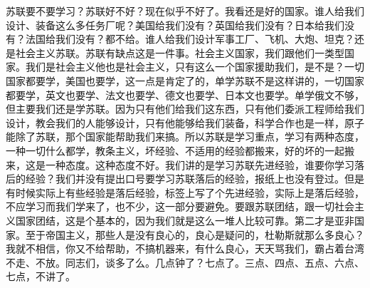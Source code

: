 苏联要不要学习？苏联好不好？现在似乎不好了。我看还是好的国家。谁人给我们设计、装备这么多任务厂呢？美国给我们没有？英国给我们没有？日本给我们没有？法国给我们没有？都不给。谁人给我们设计军事工厂、飞机、大炮、坦克？还是社会主义苏联。苏联有缺点这是一件事。社会主义国家，我们跟他们一类型国家。我们是社会主义他也是社会主义，只有这么一个国家援助我们，是不是？一切国家都要学，美国也要学，这一点是肯定了的，单学苏联不是这样讲的，一切国家都要学，英文也要学、法文也要学、德文也要学、日本文也要学。单学俄文不够，但主要我们还是学苏联。因为只有他们给我们这东西，只有他们委派工程师给我们设计，教会我们的人能够设计，只有他能够给我们装备，科学合作也是一样，原子能除了苏联，那个国家能帮助我们来搞。所以苏联是学习重点，学习有两种态度，一种一切什么都学，教条主义，坏经验、不适用的经验都搬来，好的坏的一起搬来，这是一种态度。这种态度不好。我们讲的是学习苏联先进经验，谁要你学习落后的经验？我们并没有提出口号要学习苏联落后的经验，报纸上也没有登过。但是有时候实际上有些经验是落后经验，标签上写了个先进经验，实际上是落后经验，不应学习而我们学来了，也不少，这一部分要避免。要跟苏联团结，跟一切社会主义国家团结，这是个基本的，因为我们就是这么一堆人比较可靠。第二才是亚非国家。至于帝国主义，那些人是没有良心的，良心是疑问的，杜勒斯就那么多良心？我就不相信，你又不给帮助，不搞机器来，有什么良心，天天骂我们，霸占着台湾不走、不放。同志们，谈多了么。几点钟了？七点了。三点、四点、五点、六点、七点，不讲了。
